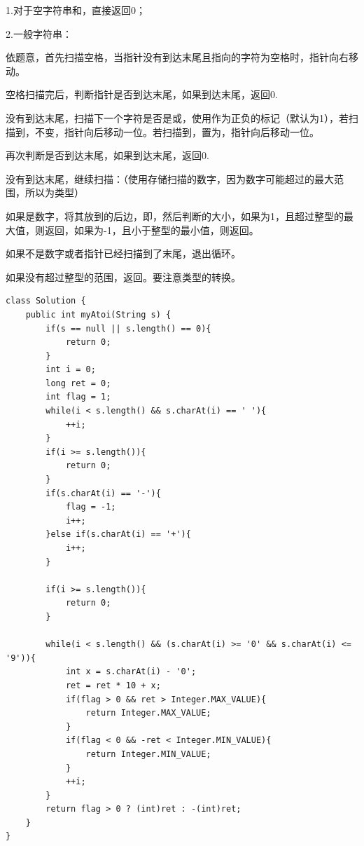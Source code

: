 \documentclass[30pt]{article}
\begin{document}
\begin{tips}
1.对于空字符串和，直接返回0；

2.一般字符串：

依题意，首先扫描空格，当指针没有到达末尾且指向的字符为空格时，指针向右移动。

空格扫描完后，判断指针是否到达末尾，如果到达末尾，返回0.

没有到达末尾，扫描下一个字符是否是\dm{+}或\dm{-}，使用作为正负的标记（默认为1），若扫描到\dm{+}，不变，指针向后移动一位。若扫描到，置为，指针向后移动一位。

再次判断是否到达末尾，如果到达末尾，返回0.

没有到达末尾，继续扫描：（使用存储扫描的数字，因为数字可能超过的最大范围，所以为类型）

如果是数字，将其放到的后边，即，然后判断的大小，如果为1，且超过整型的最大值，则返回，如果为-1，且小于整型的最小值，则返回。

如果不是数字或者指针已经扫描到了末尾，退出循环。

如果没有超过整型的范围，返回。要注意类型的转换。
\end{tips}

\begin{lstlisting}[title=字符串转换整数atoi]
class Solution {
    public int myAtoi(String s) {
        if(s == null || s.length() == 0){
            return 0;
        }
        int i = 0;
        long ret = 0;
        int flag = 1;
        while(i < s.length() && s.charAt(i) == ' '){
            ++i;
        }
        if(i >= s.length()){
            return 0;
        }
        if(s.charAt(i) == '-'){
            flag = -1;
            i++;
        }else if(s.charAt(i) == '+'){
            i++;
        }

        if(i >= s.length()){
            return 0;
        }

        while(i < s.length() && (s.charAt(i) >= '0' && s.charAt(i) <= '9')){
            int x = s.charAt(i) - '0';
            ret = ret * 10 + x;
            if(flag > 0 && ret > Integer.MAX_VALUE){
                return Integer.MAX_VALUE;
            }
            if(flag < 0 && -ret < Integer.MIN_VALUE){
                return Integer.MIN_VALUE;
            }
            ++i;
        }
        return flag > 0 ? (int)ret : -(int)ret;
    }
}
\end{lstlisting}
\end{document}
